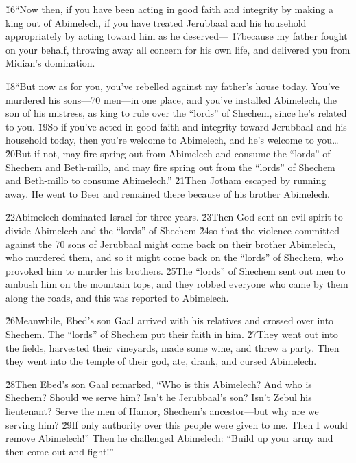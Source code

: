 \v{16}``Now then, if you have been acting in good faith and integrity by making a king out of Abimelech, if you have treated Jerubbaal and his household appropriately by acting toward him as he deserved--- \v{17}because my father fought on your behalf, throwing away all concern for his own life, and delivered you from Midian's domination.

\v{18}``But now as for you, you've rebelled against my father's house today. You've murdered his sons---70 men---in one place, and you've installed Abimelech, the son of his mistress, as king to rule over the ``lords'' of Shechem, since he's related to you. \v{19}So if you've acted in good faith and integrity toward Jerubbaal and his household today, then you're welcome to Abimelech, and he's welcome to you{\ldots} \v{20}But if not, may fire spring out from Abimelech and consume the ``lords'' of Shechem and Beth-millo, and may fire spring out from the ``lords'' of Shechem and Beth-millo to consume Abimelech.'' \v{21}Then Jotham escaped by running away. He went to Beer and remained there because of his brother Abimelech.

\v{22}Abimelech dominated Israel for three years. \v{23}Then God sent an evil spirit to divide Abimelech and the ``lords'' of Shechem \v{24}so that the violence committed against the 70 sons of Jerubbaal might come back on their brother Abimelech, who murdered them, and so it might come back on the ``lords'' of Shechem, who provoked him to murder his brothers. \v{25}The ``lords'' of Shechem sent out men to ambush him on the mountain tops, and they robbed everyone who came by them along the roads, and this was reported to Abimelech.

\v{26}Meanwhile, Ebed's son Gaal arrived with his relatives and crossed over into Shechem. The ``lords'' of Shechem put their faith in him. \v{27}They went out into the fields, harvested their vineyards, made some wine, and threw a party. Then they went into the temple of their god, ate, drank, and cursed Abimelech.

\v{28}Then Ebed's son Gaal remarked, ``Who is this Abimelech? And who is Shechem? Should we serve him? Isn't he Jerubbaal's son? Isn't Zebul his lieutenant? Serve the men of Hamor, Shechem's ancestor---but why are we serving him? \v{29}If only authority over this people were given to me. Then I would remove Abimelech!'' Then he challenged Abimelech: ``Build up your army and then come out and fight!''

